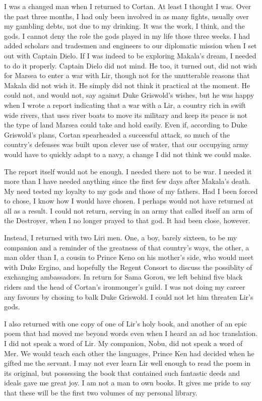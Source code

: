 \documentclass{article}
\begin{document}
I was a changed man when I returned to Cortan. At least I thought I was. Over the past three months, I had only been involved in as many fights, usually over my gambling debts, not due to my drinking. It was the work, I think, and the gods. I cannot deny the role the gods played in my life those three weeks. I had added scholars and tradesmen and engineers to our diplomatic mission when I set out with Captain Dielo. If I was indeed to be exploring Makala's dream, I needed to do it properly. Captain Dielo did not mind. He too, it turned out, did not wish for Marsea to enter a war with Lir, though not for the unutterable reasons that Makala did not wish it. He simply did not think it practical at the moment. He could not, and would not, say against Duke Griswold's wishes, but he was happy when I wrote a report indicating that a war with a Lir, a country rich in swift wide rivers, that uses river boats to move its military and keep its peace is not the type of land Marsea could take and hold easily. Even if, according to Duke Griswold's plans, Cortan spearheaded a successful attack, so much of the country's defenses was built upon clever use of water, that our occupying army would have to quickly adapt to a navy, a change I did not think we could make. 

The report itself would not be enough. I needed there not to be war. I needed it more than I have needed anything since the first few days after Makala's death. My need tested my loyalty to my gods and those of my fathers. Had I been forced to chose, I know how I would have chosen. I perhaps would not have returned at all as a result. I could not return, serving in an army that called itself an arm of the Destroyer, when I no longer prayed to that god. It had been close, however. 

Instead, I returned with two Liri men. One, a boy, barely sixteen, to be my companion and a reminder of the greatness of that country's ways, the other, a man older than I, a cousin to Prince Keno on his mother's side, who would meet with Duke Ergino, and hopefully the Regent Consort to discuss the possiblity of exchanging ambassadors. In return for Sama Gorou, we left behind five black riders and the head of Cortan's ironmonger's guild. I was not doing my career any favours by chosing to balk Duke Griswold. I could not let him threaten Lir's gods. 

I also returned with one copy of one of Lir's holy book, and another of an epic poem that had moved me beyond words even when I heard an ad hoc translation. I did not speak a word of Lir. My companion, Nobu, did not speak a word of Mer. We would teach each other the languages, Prince Ken had decided when he gifted me the servant. I may not ever learn Lir well enough to read the poem in its original, but possessing the book that contained such fantastic deeds and ideals gave me great joy. I am not a man to own books. It gives me pride to say that these will be the first two volumes of my personal library. 
\end{document}
